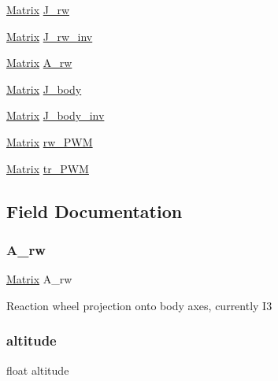 \begin{DoxyCompactItemize}
\item 
\mbox{\hyperlink{struct___matrix}{Matrix}} \mbox{\hyperlink{struct_a_c_s_type_ae3e39e9013f49cf0f58982ab30dff4e5}{J\+\_\+rw}}
\item 
\mbox{\hyperlink{struct___matrix}{Matrix}} \mbox{\hyperlink{struct_a_c_s_type_a1f6625b6635f3eb93819d23c8e73d3cd}{J\+\_\+rw\+\_\+inv}}
\item 
\mbox{\hyperlink{struct___matrix}{Matrix}} \mbox{\hyperlink{struct_a_c_s_type_a1e497ee0d383f2891d76ec4eb94943f4}{A\+\_\+rw}}
\item 
\mbox{\hyperlink{struct___matrix}{Matrix}} \mbox{\hyperlink{struct_a_c_s_type_ae9005a98c5e356c3c718057fb431215a}{J\+\_\+body}}
\item 
\mbox{\hyperlink{struct___matrix}{Matrix}} \mbox{\hyperlink{struct_a_c_s_type_a347bdaa887a9c2a386f0785e238f1823}{J\+\_\+body\+\_\+inv}}
\item 
\mbox{\hyperlink{struct___matrix}{Matrix}} \mbox{\hyperlink{struct_a_c_s_type_abadd729b1d9de2b8414c7949637aac27}{rw\+\_\+\+P\+WM}}
\item 
\mbox{\hyperlink{struct___matrix}{Matrix}} \mbox{\hyperlink{struct_a_c_s_type_a479836cb6277d49ac363e5aef596c7db}{tr\+\_\+\+P\+WM}}
\end{DoxyCompactItemize}


\subsection{Field Documentation}
\mbox{\label{struct_a_c_s_type_a1e497ee0d383f2891d76ec4eb94943f4}} 
\subsubsection{\texorpdfstring{A\_rw}{A\_rw}}
{\footnotesize\ttfamily \mbox{\hyperlink{struct___matrix}{Matrix}} A\+\_\+rw}

Reaction wheel projection onto body axes, currently I3 \mbox{\label{struct_a_c_s_type_a0e13a4b4ae0cefdac2a413284239caa6}} 
\subsubsection{\texorpdfstring{altitude}{altitude}}
{\footnotesize\ttfamily float altitude}

